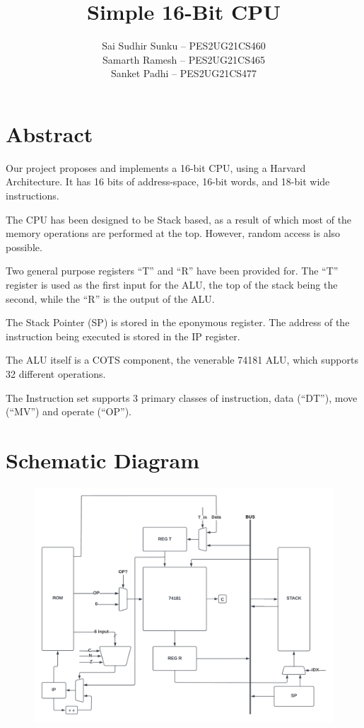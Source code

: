 \documentclass{article}
\title{\vspace{-0.5in}\textbf{Simple 16-Bit CPU}}
\author{Sai Sudhir Sunku -- PES2UG21CS460 \\ Samarth Ramesh -- PES2UG21CS465 \\ Sanket Padhi -- PES2UG21CS477}
\date{}
\begin{document}
\maketitle
\section{Abstract}
Our project proposes and implements a 16-bit CPU, using a Harvard Architecture.
It has 16 bits of address-space, 16-bit words, and 18-bit wide instructions.

The CPU has been designed to be Stack based, as a result of which most of the memory operations are performed at the top. 
However, random access is also possible.

Two general purpose registers ``T'' and ``R'' have been provided for.
The ``T'' register is used as the first input for the ALU, the top of the stack being the second,  while the ``R'' is the output of the ALU.

The Stack Pointer (SP) is stored in the eponymous register.
The address of the instruction being executed is stored in the IP register.

The ALU itself is a COTS component, the venerable 74181 ALU, which supports 32 different operations.

The Instruction set supports 3 primary classes of instruction, data (``DT''), move (``MV'') and operate (``OP'').

\section{Schematic Diagram}
\begin{figure}[h!]
    \includegraphics[scale=0.15]{cd.png}
    \centering
\end{figure}
\end{document}
